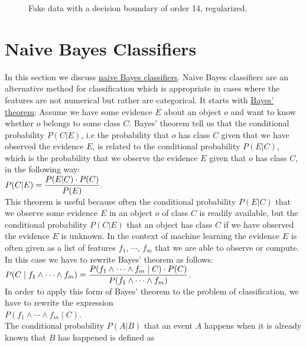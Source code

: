 \begin{figure}[!th]
\caption{Fake data with a decision boundary of order 14, regularized.}
\label{fig:fake-data-14-reg.pdf}
\end{figure}

\section{Naive Bayes Classifiers}
In this section we discuss \href{https://en.wikipedia.org/wiki/Naive_Bayes_classifier}{naive Bayes classifiers}.
Naive Bayes classifiers are an alternative method for classification which is appropriate in cases where the
features are not numerical but rather are categorical.  It starts with \href{https://en.wikipedia.org/wiki/Bayes%27_theorem}{Bayes' theorem}:
Assume we have some evidence $E$ about an object $o$ and want to know whether $o$ belongs to some class $C$.
Bayes' theorem tell us that the conditional probability $P(C|E)$, i.e the probability that $o$ has class $C$
given that we have observed the evidence $E$, is related to the conditional probability $P(E|C)$, which is the probability that we
observe the evidence $E$ given that $o$ has class $C$, in the following way:
\\[0.2cm]
\hspace*{1.3cm}
$\displaystyle P(C|E) = \frac{P(E|C) \cdot P(C)}{P(E)}$.
\\[0.2cm]
This theorem is useful because often the conditional probability $P(E|C)$ that we observe some evidence $E$ in an object
$o$ of class $C$ is readily available, but the conditional probability $P(C|E)$ that an object has class $C$ if
we have observed the evidence $E$ is unknown.  In the context of machine learning the evidence $E$ is often
given as a list of features $f_1$, $\cdots$, $f_m$ that we are able to observe or compute.  In this case we
have to rewrite Bayes' theorem as follows:
\\[0.2cm]
\hspace*{1.3cm}
$\displaystyle P(C\;|\;f_1 \wedge \cdots \wedge f_m) = \frac{P(f_1 \wedge \cdots \wedge f_m\;|\;C) \cdot P(C)}{P(f_1 \wedge \cdots \wedge f_m)}$.
\\[0.2cm]
In order to apply this form of Bayes' theorem to the problem of classification, we have to rewrite the expression
\\[0.2cm]
\hspace*{1.3cm}
$P(f_1 \wedge \cdots \wedge f_m\;|\;C)$.
\\[0.2cm]
The conditional probability $P(A|B)$ that an event $A$ happens when it is already known that $B$ has happened is defined as
